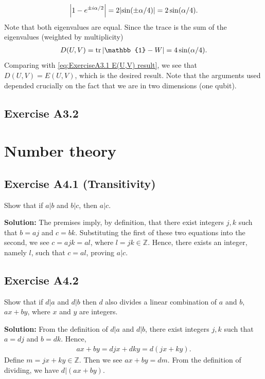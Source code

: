 \documentclass{book}
\begin{document}
    \begin{align}
        \abs{1-e^{\pm i\alpha/2}} = 2\abs{\sin(\pm \alpha/4)} = 2 \sin (\alpha/4).
    \end{align}
    Note that both eigenvalues are equal. Since the trace is the sum of the eigenvalues (weighted by multiplicity)
    \begin{align}
        D(U,V) = \tr \abs{\mathbb{1}-W} = 4\sin(\alpha/4).
    \end{align}
    Comparing with \eqref{eq:ExerciseA3.1 E(U,V) result}, we see that $D(U,V) = E(U,V)$, which is the desired result. Note that the arguments used depended crucially on the fact that we are in two dimensions (one qubit).
    
\section*{Exercise A3.2}

\chapter{Number theory}


\section*{Exercise A4.1 (Transitivity)}
    Show that if $a|b$ and $b|c$, then $a|c$.
    
    \textbf{Solution:} The premises imply, by definition, that there exist integers $j, k$ such that $b = a j$ and $c = b k$. Substituting the first of these two equations into the second, we see $c = a j k = a l$, where $l = j k \in \mathbb{Z}$. Hence, there exists an integer, namely $l$, such that $c = a l$, proving $a |c$.

\section*{Exercise A4.2}
    Show that if $d|a$ and $d|b$ then $d$ also divides a linear combination of $a$ and $b$, $ax+by$, where $x$ and $y$ are integers.
    
    \textbf{Solution:} From the definition of $d|a$ and $d|b$, there exist integers $j, k $ such that $a = d j$ and $b= dk$. Hence,
    \begin{align}
        ax + by = djx + dky = d(jx + ky).
    \end{align}
    Define $m = jx +ky \in \mathbb{Z}$. Then we see $ax + by = dm$. From the definition of dividing, we have $d|(ax+by)$. 
\end{document}
